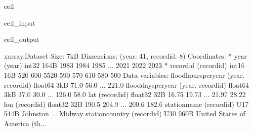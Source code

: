 \documentclass[letterpaper,10pt,english]{jupyterBook}
\begin{document}
\begin{sphinxuseclass}{cell}
\begin{sphinxVerbatimInput}
\begin{sphinxuseclass}{cell_input}
\begin{sphinxVerbatim}[commandchars=\\\{\}]
   

\end{sphinxVerbatim}

\end{sphinxuseclass}\end{sphinxVerbatimInput}
\begin{sphinxVerbatimOutput}

\begin{sphinxuseclass}{cell_output}
\begin{sphinxVerbatim}[commandchars=\\\{\}]
\PYGZlt{}xarray.Dataset\PYGZgt{} Size: 7kB
Dimensions:               (year: 41, record\PYGZus{}id: 8)
Coordinates:
  * year                  (year) int32 164B 1983 1984 1985 ... 2021 2022 2023
  * record\PYGZus{}id             (record\PYGZus{}id) int16 16B 520 600 5520 590 570 610 580 500
Data variables:
    flood\PYGZus{}hours\PYGZus{}per\PYGZus{}year  (year, record\PYGZus{}id) float64 3kB 71.0 56.0 ... 221.0
    flood\PYGZus{}days\PYGZus{}per\PYGZus{}year   (year, record\PYGZus{}id) float64 3kB 37.0 30.0 ... 126.0 58.0
    lat                   (record\PYGZus{}id) float32 32B 16.75 19.73 ... 21.97 28.22
    lon                   (record\PYGZus{}id) float32 32B 190.5 204.9 ... 200.6 182.6
    station\PYGZus{}name          (record\PYGZus{}id) \PYGZlt{}U17 544B \PYGZsq{}Johnston\PYGZsq{} ... \PYGZsq{}Midway\PYGZsq{}
    station\PYGZus{}country       (record\PYGZus{}id) \PYGZlt{}U30 960B \PYGZsq{}United States of America (th...
\end{sphinxVerbatim}

\end{sphinxuseclass}\end{sphinxVerbatimOutput}

\end{sphinxuseclass}
\end{document}
